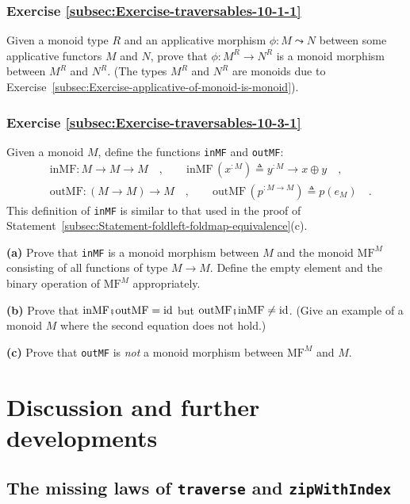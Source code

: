 \subsubsection{Exercise \label{subsec:Exercise-traversables-10-1-1}\ref{subsec:Exercise-traversables-10-1-1}}

Given a monoid type $R$ and an applicative morphism $\phi:M\leadsto N$
between some applicative functors $M$ and $N$, prove that $\phi:M^{R}\rightarrow N^{R}$
is a monoid morphism between $M^{R}$ and $N^{R}$. (The types $M^{R}$
and $N^{R}$ are monoids due to Exercise~\ref{subsec:Exercise-applicative-of-monoid-is-monoid}).

\subsubsection{Exercise \label{subsec:Exercise-traversables-10-3-1}\ref{subsec:Exercise-traversables-10-3-1}}

Given a monoid $M$, define the functions \lstinline!inMF! and \lstinline!outMF!:
\begin{align*}
 & \text{inMF}:M\rightarrow M\rightarrow M\quad,\quad\quad\text{inMF}\,(x^{:M})\triangleq y^{:M}\rightarrow x\oplus y\quad,\\
 & \text{outMF}:(M\rightarrow M)\rightarrow M\quad,\quad\quad\text{outMF}\,(p^{:M\rightarrow M})\triangleq p(e_{M})\quad.
\end{align*}
This definition of \lstinline!inMF! is similar to that used in the
proof of Statement~\ref{subsec:Statement-foldleft-foldmap-equivalence}(c).

\textbf{(a)} Prove that \lstinline!inMF! is a monoid morphism between
$M$ and the monoid $\text{MF}^{M}$ consisting of all functions of
type $M\rightarrow M$. Define the empty element and the binary operation
of $\text{MF}^{M}$ appropriately.

\textbf{(b)} Prove that $\text{inMF}\bef\text{outMF}=\text{id}$ but
$\text{outMF}\bef\text{inMF}\neq\text{id}$. (Give an example of a
monoid $M$ where the second equation does not hold.)

\textbf{(c)} Prove that \lstinline!outMF! is \emph{not} a monoid
morphism between $\text{MF}^{M}$ and $M$.

\section{Discussion and further developments}

\subsection{The missing laws of \texttt{traverse} and \texttt{zipWithIndex}\label{subsec:Laws-of-traverse-and-zipWithIndex}}

